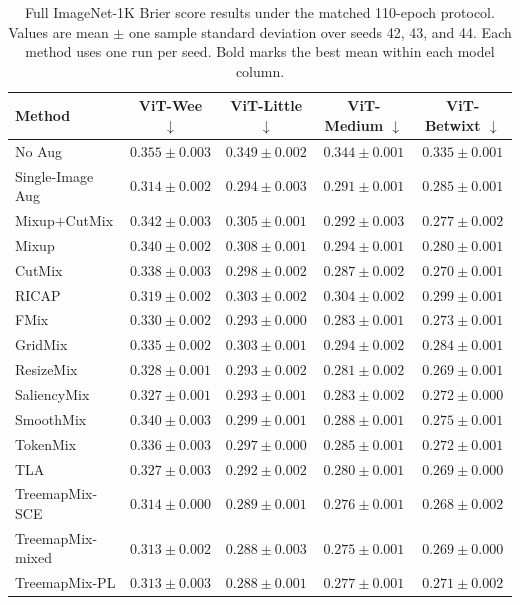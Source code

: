 \begin{table}[t]
  \caption{Full ImageNet-1K Brier score results under the matched 110-epoch protocol. Values are mean $\pm$ one sample standard deviation over seeds 42, 43, and 44. Each method uses one run per seed. Bold marks the best mean within each model column.}
  \label{tab:in1k-full-results-brier}
  \centering
  \footnotesize
  \setlength{\tabcolsep}{4pt}
  \begin{tabular}{@{}lcccc@{}}
    \toprule
    Method & ViT-Wee $\downarrow$ & ViT-Little $\downarrow$ & ViT-Medium $\downarrow$ & ViT-Betwixt $\downarrow$ \\
    \midrule
    No Aug & $0.355 \pm 0.003$ & $0.349 \pm 0.002$ & $0.344 \pm 0.001$ & $0.335 \pm 0.001$ \\
    Single-Image Aug & $0.314 \pm 0.002$ & $0.294 \pm 0.003$ & $0.291 \pm 0.001$ & $0.285 \pm 0.001$ \\
    Mixup+CutMix & $0.342 \pm 0.003$ & $0.305 \pm 0.001$ & $0.292 \pm 0.003$ & $0.277 \pm 0.002$ \\
    Mixup & $0.340 \pm 0.002$ & $0.308 \pm 0.001$ & $0.294 \pm 0.001$ & $0.280 \pm 0.001$ \\
    CutMix & $0.338 \pm 0.003$ & $0.298 \pm 0.002$ & $0.287 \pm 0.002$ & $0.270 \pm 0.001$ \\
    RICAP & $0.319 \pm 0.002$ & $0.303 \pm 0.002$ & $0.304 \pm 0.002$ & $0.299 \pm 0.001$ \\
    FMix & $0.330 \pm 0.002$ & $0.293 \pm 0.000$ & $0.283 \pm 0.001$ & $0.273 \pm 0.001$ \\
    GridMix & $0.335 \pm 0.002$ & $0.303 \pm 0.001$ & $0.294 \pm 0.002$ & $0.284 \pm 0.001$ \\
    ResizeMix & $0.328 \pm 0.001$ & $0.293 \pm 0.002$ & $0.281 \pm 0.002$ & $0.269 \pm 0.001$ \\
    SaliencyMix & $0.327 \pm 0.001$ & $0.293 \pm 0.001$ & $0.283 \pm 0.002$ & $0.272 \pm 0.000$ \\
    SmoothMix & $0.340 \pm 0.003$ & $0.299 \pm 0.001$ & $0.288 \pm 0.001$ & $0.275 \pm 0.001$ \\
    TokenMix & $0.336 \pm 0.003$ & $0.297 \pm 0.000$ & $0.285 \pm 0.001$ & $0.272 \pm 0.001$ \\
    TLA & $0.327 \pm 0.003$ & $0.292 \pm 0.002$ & $0.280 \pm 0.001$ & $0.269 \pm 0.000$ \\
    TreemapMix-SCE & $0.314 \pm 0.000$ & $0.289 \pm 0.001$ & $0.276 \pm 0.001$ & $\mathbf{0.268 \pm 0.002}$ \\
    TreemapMix-mixed & $0.313 \pm 0.002$ & $\mathbf{0.288 \pm 0.003}$ & $\mathbf{0.275 \pm 0.001}$ & $0.269 \pm 0.000$ \\
    TreemapMix-PL & $\mathbf{0.313 \pm 0.003}$ & $0.288 \pm 0.001$ & $0.277 \pm 0.001$ & $0.271 \pm 0.002$ \\
    \bottomrule
  \end{tabular}
\end{table}
